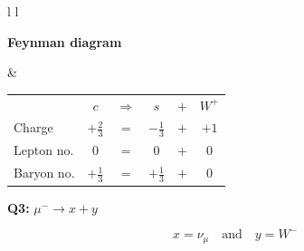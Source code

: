 \documentclass[12pt]{article}
\begin{document}
\begin{tabular}{l l}

\begin{minipage}[t]{0.46\textwidth}
\vspace{0pt}
\textbf{Feynman diagram}

\vspace{0.6cm}

\begin{tikzpicture}
\begin{feynman}
  \vertex (l1) at (0,0) {\(c\)};
  \vertex [coordinate] (a) at (1,2) {};
  \vertex (l2) at (0,4) {\(s\)};
  \vertex (b) at (4,2) {};

  \diagram*{
    (l1) -- [fermion] (a) -- [fermion] (l2),
    (a) -- [boson, edge label=\(W^+\), momentum'={}] (b),
  };
\end{feynman}
\end{tikzpicture}
\end{minipage}
&
\begin{minipage}[t]{0.50\textwidth}
\vspace{0pt}

\renewcommand{\arraystretch}{1.4}
\begin{tabular}{@{}l c c c c c@{}}
 & \(c\) & \(\Rightarrow\) & \(s\) & \(+\) & \(W^+\) \\
Charge & \(+\tfrac{2}{3}\) & \(=\) & \(-\tfrac{1}{3}\) & \(+\) & \(+1\) \\
Lepton no. & \(0\) & \(=\) & \(0\) & \(+\) & \(0\) \\
Baryon no. & \(+\tfrac{1}{3}\) & \(=\) & \(+\tfrac{1}{3}\) & \(+\) & \(0\) \\
\end{tabular}

\end{minipage}

\end{tabular}

\vspace{0.8cm}

\textbf{Q3:} \(\mu^- \rightarrow x + y\)

\[
\boxed{x=\nu_\mu \quad\text{and}\quad y=W^-}
\]

\vspace{0.4cm}
\end{document}
